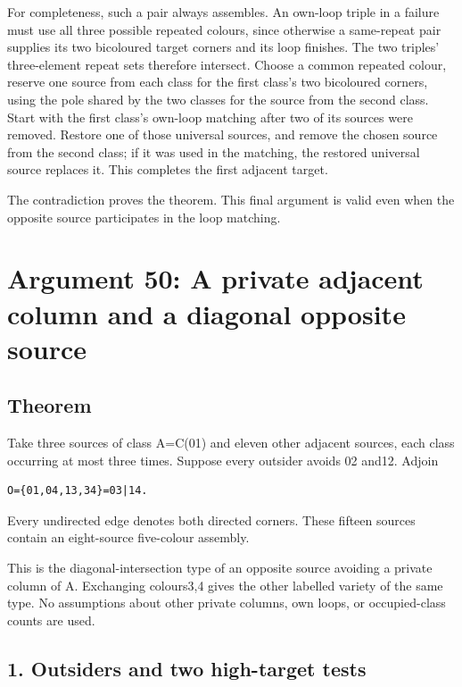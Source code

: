 \documentclass[
  10pt,
]{article}
\begin{document}
For completeness, such a pair always assembles. An own-loop triple in a
failure must use all three possible repeated colours, since otherwise a
same-repeat pair supplies its two bicoloured target corners and its loop
finishes. The two triples' three-element repeat sets therefore
intersect. Choose a common repeated colour, reserve one source from each
class for the first class's two bicoloured corners, using the pole
shared by the two classes for the source from the second class. Start
with the first class's own-loop matching after two of its sources were
removed. Restore one of those universal sources, and remove the chosen
source from the second class; if it was used in the matching, the
restored universal source replaces it. This completes the first adjacent
target.

The contradiction proves the theorem. This final argument is valid even
when the opposite source participates in the loop matching.

\hypertarget{arg-50}{%
\section{Argument 50: A private adjacent column and a diagonal opposite
source}\label{arg-50}}

\hypertarget{theorem-2}{%
\subsection*{Theorem}\label{theorem-2}}

Take three sources of class A=C(01) and eleven other adjacent sources,
each class occurring at most three times. Suppose every outsider avoids
02 and12. Adjoin

\begin{verbatim}
O={01,04,13,34}=03|14.
\end{verbatim}

Every undirected edge denotes both directed corners. These fifteen
sources contain an eight-source five-colour assembly.

This is the diagonal-intersection type of an opposite source avoiding a
private column of A. Exchanging colours3,4 gives the other labelled
variety of the same type. No assumptions about other private columns,
own loops, or occupied-class counts are used.

\hypertarget{outsiders-and-two-high-target-tests}{%
\subsection*{1. Outsiders and two high-target
tests}\label{outsiders-and-two-high-target-tests}}
\end{document}
